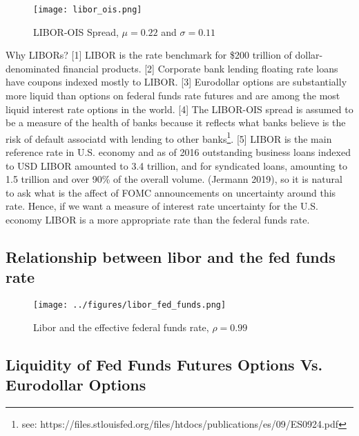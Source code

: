 \documentclass[11pt]{article}
\begin{document}
\begin{figure}
	\centering
	\texttt{[image: libor\_ois.png]}
	\caption{LIBOR-OIS Spread, $\mu = 0.22$ and $\sigma = 0.11$}
	\label{fig:libor_ois_spread}
\end{figure}
Why LIBORs? [1] LIBOR is the rate benchmark for \$200 trillion of dollar-denominated financial products. [2] Corporate bank lending floating rate loans have coupons indexed mostly to LIBOR. [3] Eurodollar options are substantially more liquid than options on federal funds rate futures and are among the most liquid interest rate options in the world. [4] The LIBOR-OIS spread is assumed to be a measure of the health of banks because it reflects what banks believe is the risk of default associatd with lending to other banks\footnote{see: https://files.stlouisfed.org/files/htdocs/publications/es/09/ES0924.pdf}.
[5] LIBOR is the main reference rate in U.S. economy and as of 2016 outstanding business loans indexed to USD LIBOR amounted to 3.4 trillion, and for syndicated loans, amounting to 1.5 trillion and over 90\% of the overall volume.  (Jermann 2019), so it is natural to ask what is the affect of FOMC announcements on uncertainty around this rate. Hence, if we want a measure of interest rate uncertainty for the U.S. economy LIBOR is a more appropriate rate than the federal funds rate.  \\
\subsection{Relationship between libor and the fed funds rate}
\begin{figure}
	\centering
	\texttt{[image: ../figures/libor\_fed\_funds.png]}
	\caption{Libor and the effective federal funds rate, $\rho = 0.99$}
	\label{fig:libor_fed_funds_rate}
\end{figure}

\subsection{Liquidity of Fed Funds Futures Options Vs. Eurodollar Options}
\end{document}
